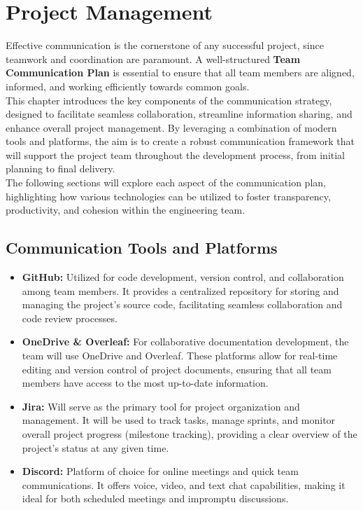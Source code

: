 \chapter{Project Management}
\label{chapter:teamplan}
Effective communication is the cornerstone of any successful project, since teamwork and coordination are paramount. A well-structured \textbf{Team Communication Plan} is essential to ensure that all team members are aligned, informed, and working efficiently towards common goals. \\
This chapter introduces the key components of the communication strategy, designed to facilitate seamless collaboration, streamline information sharing, and enhance overall project management. By leveraging a combination of modern tools and platforms, the aim is to create a robust communication framework that will support the project team throughout the development process, from initial planning to final delivery. \\
The following sections will explore each aspect of the communication plan, highlighting how various technologies can be utilized to foster transparency, productivity, and cohesion within the engineering team.

\section{Communication Tools and Platforms}
\label{section:comunication_tools}

\begin{itemize}
    \item \textbf{GitHub: } Utilized for code development, version control, and collaboration among team members. It provides a centralized repository for storing and managing the project's source code, facilitating seamless collaboration and code review processes.
    \item \textbf{OneDrive \& Overleaf: } For collaborative documentation development, the team will use OneDrive and Overleaf. These platforms allow for real-time editing and version control of project documents, ensuring that all team members have access to the most up-to-date information.
    \item \textbf{Jira: } Will serve as the primary tool for project organization and management. It will be used to track tasks, manage sprints, and monitor overall project progress (milestone tracking), providing a clear overview of the project's status at any given time.
    \item \textbf{Discord: } Platform of choice for online meetings and quick team communications. It offers voice, video, and text chat capabilities, making it ideal for both scheduled meetings and impromptu discussions.
\end{itemize}

